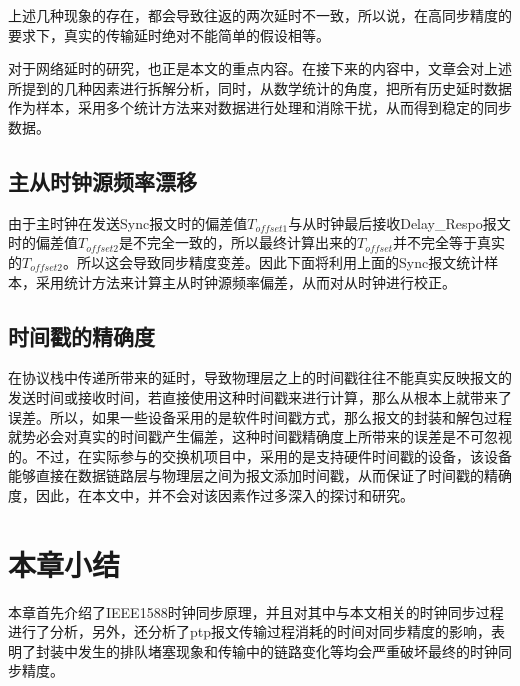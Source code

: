 上述几种现象的存在，都会导致往返的两次延时不一致，所以说，在高同步精度的要求下，真实的传输延时绝对不能简单的假设相等。

对于网络延时的研究，也正是本文的重点内容。在接下来的内容中，文章会对上述所提到的几种因素进行拆解分析，同时，从数学统计的角度，把所有历史延时数据作为样本，采用多个统计方法来对数据进行处理和消除干扰，从而得到稳定的同步数据。

\subsection{主从时钟源频率漂移}
由于主时钟在发送Sync报文时的偏差值$T_{offset1}$与从时钟最后接收Delay\_Respo报文时的偏差值$T_{offset2}$是不完全一致的，所以最终计算出来的$T_{offset}$并不完全等于真实的$T_{offset2}$。所以这会导致同步精度变差。因此下面将利用上面的Sync报文统计样本，采用统计方法来计算主从时钟源频率偏差，从而对从时钟进行校正。

\subsection{时间戳的精确度}
\label{sec:1588_problem_2}
在协议栈中传递所带来的延时，导致物理层之上的时间戳往往不能真实反映报文的发送时间或接收时间，若直接使用这种时间戳来进行计算，那么从根本上就带来了误差\supercite{53}。所以，如果一些设备采用的是软件时间戳方式，那么报文的封装和解包过程就势必会对真实的时间戳产生偏差，这种时间戳精确度上所带来的误差是不可忽视的。不过，在实际参与的交换机项目中，采用的是支持硬件时间戳的设备，该设备能够直接在数据链路层与物理层之间为报文添加时间戳，从而保证了时间戳的精确度，因此，在本文中，并不会对该因素作过多深入的探讨和研究。

\section{本章小结}
本章首先介绍了IEEE1588时钟同步原理，并且对其中与本文相关的时钟同步过程进行了分析，另外，还分析了ptp报文传输过程消耗的时间对同步精度的影响，表明了封装中发生的排队堵塞现象和传输中的链路变化等均会严重破坏最终的时钟同步精度。



